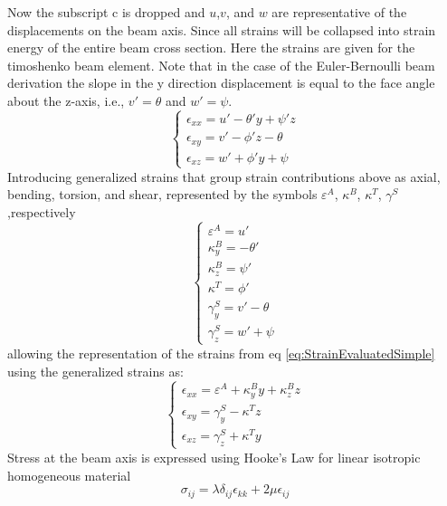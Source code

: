 Now the subscript c is dropped and $ u $,$ v $, and $ w $ are representative of the displacements on the beam axis. Since all strains will be collapsed into strain energy of the entire beam cross section. Here the strains are given for the timoshenko beam element. Note that in the case of the Euler-Bernoulli beam derivation the slope in the y direction displacement is equal to the face angle about the z-axis, i.e., $v'=\theta$ and $w'=\psi$.
\begin{equation}\label{eq:StrainEvaluatedSimple}
\left\{\begin{array}{l}
\epsilon_{xx}=u'-\theta'y+\psi'z\\
\epsilon_{xy}=v'-\phi'z-\theta\\
\epsilon_{xz}=w'+\phi'y+\psi
\end{array}\right.
\end{equation}
Introducing generalized strains that group strain contributions above as axial, bending, torsion, and shear, represented by the symbols $ \varepsilon^A $, $ \kappa^{B} $, $ \kappa^T $, $ \gamma^S $,respectively
\begin{equation}\label{eq:GeneralizedStrains}
\left\{\begin{array}{l}
\varepsilon^A=u'\\
\kappa^{B}_{y}=-\theta'\\
\kappa^{B}_{z}=\psi'\\
\kappa^T=\phi'\\
\gamma^{S}_{y}=v'-\theta\\
\gamma^{S}_{z}=w'+\psi\end{array}\right.
\end{equation}
allowing the representation of the strains from eq \ref{eq:StrainEvaluatedSimple} using the generalized strains as:
\begin{equation}\label{eq:StrainEvaluatedSimpleGeneralized}
\left\{\begin{array}{l}
\epsilon_{xx}=\varepsilon^A+\kappa^B_yy+\kappa^B_zz\\
\epsilon_{xy}=\gamma^S_y-\kappa^Tz\\
\epsilon_{xz}=\gamma^S_z+\kappa^Ty
\end{array}\right.
\end{equation}
Stress at the beam axis is expressed using Hooke's Law for linear isotropic homogeneous material
\begin{equation}\label{LinearElasticStressStrainRelationship}
\sigma_{ij}=\lambda\delta_{ij}\epsilon_{kk}+2\mu\epsilon_{ij}
\end{equation}
